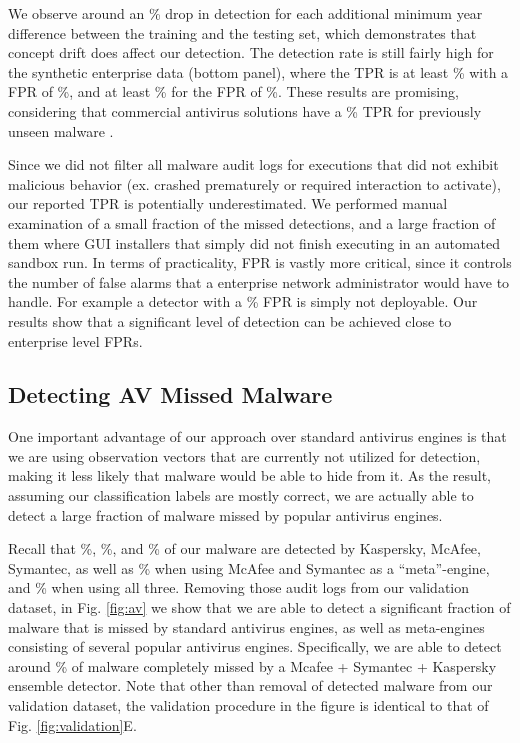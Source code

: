 \documentclass{sig-alternate-2013}
\begin{document}
We observe around an \% drop in detection for each additional minimum year difference between the training and the testing set, which demonstrates that concept drift does affect our detection. The detection rate is still fairly high for the synthetic enterprise data (bottom panel), where the TPR is at least \% with a FPR of \%, and at least \% for the FPR of \%. These results are promising, considering that commercial antivirus solutions have a \% TPR for previously unseen malware \cite{lastline2015}.

Since we did not filter all malware audit logs for executions that did not exhibit malicious behavior (ex. crashed prematurely or required interaction to activate), our reported TPR is potentially underestimated. We performed manual examination of a small fraction of the missed detections, and a large fraction of them where GUI installers that simply did not finish executing in an automated sandbox run. In terms of practicality, FPR is vastly more critical, since it controls the number of false alarms that a enterprise network administrator would have to handle. For example a detector with a \% FPR is simply not deployable. Our results show that a significant level of detection can be achieved close to enterprise level FPRs.

\subsection{Detecting AV Missed Malware}

One important advantage of our approach over standard antivirus engines is that we are using observation vectors that are currently not utilized for detection, making it less likely that malware would be able to hide from it. As the result, assuming our classification labels are mostly correct, we are actually able to detect a large fraction of malware missed by popular antivirus engines. 

Recall that \%, \%, and \% of our malware are detected by Kaspersky, McAfee, Symantec, as well as \% when using McAfee and Symantec as a ``meta''-engine, and \% when using all three. Removing those audit logs from our validation dataset, in Fig. \ref{fig:av} we show that we are able to detect a significant fraction of malware that is missed by standard antivirus engines, as well as meta-engines consisting of several popular antivirus engines. Specifically, we are able to detect around \% of malware completely missed by a Mcafee + Symantec + Kaspersky ensemble detector.  Note that other than removal of detected malware from our validation dataset, the validation procedure in the figure is identical to that of Fig. \ref{fig:validation}E.
\end{document}
